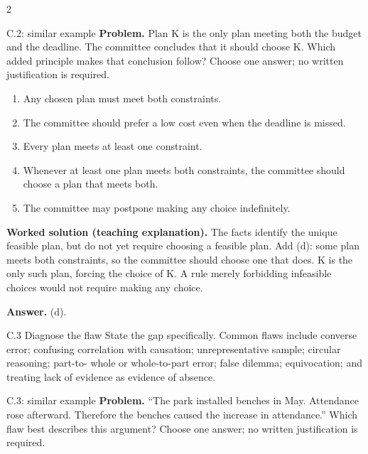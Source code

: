 \documentclass[10pt]{extarticle}
\begin{document}
\begin{multicols}{2}
\begin{workedbox}{C.2: similar example}
\textbf{Problem.} Plan K is the only plan meeting both the budget and the deadline. The committee concludes that it should choose K. Which added principle makes that conclusion follow? Choose one answer; no written justification is required.

\begin{enumerate}[label=(\alph*)]
\item Any chosen plan must meet both constraints.
\item The committee should prefer a low cost even when the deadline is missed.
\item Every plan meets at least one constraint.
\item Whenever at least one plan meets both constraints, the committee should choose a plan that meets both.
\item The committee may postpone making any choice indefinitely.
\end{enumerate}
\textbf{Worked solution (teaching explanation).} The facts identify the unique feasible plan, but do not yet require choosing a feasible plan. Add (d): some plan meets both constraints, so the committee should choose one that does. K is the only such plan, forcing the choice of K. A rule merely forbidding infeasible choices would not require making any choice.

\textbf{Answer.} (d).
\end{workedbox}

\begin{methodbox}{C.3 Diagnose the flaw}
State the gap specifically. Common flaws include converse error; confusing
correlation with causation; unrepresentative sample; circular reasoning; part-to-
whole or whole-to-part error; false dilemma; equivocation; and treating lack of
evidence as evidence of absence.
\end{methodbox}

\begin{workedbox}{C.3: similar example}
\textbf{Problem.} ``The park installed benches in May. Attendance rose afterward. Therefore the benches caused the increase in attendance.'' Which flaw best describes this argument? Choose one answer; no written justification is required.


\end{workedbox}
\end{multicols}
\end{document}

